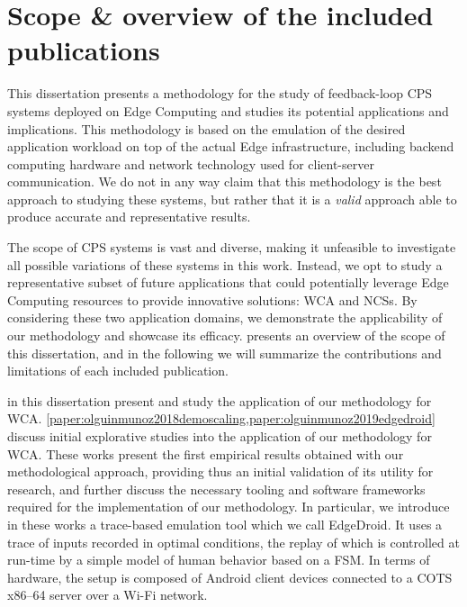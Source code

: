 \section{Scope \& overview of the included publications}

This dissertation presents a methodology for the study of feedback-loop \gls{CPS} systems deployed on Edge Computing and studies its potential applications and implications.
This methodology is based on the emulation of the desired application workload on top of the actual Edge infrastructure, including backend computing hardware and network technology used for client-server communication.
We do not in any way claim that this methodology is the best approach to studying these systems, but rather that it is a \emph{valid} approach able to produce accurate and representative results.



The scope of \gls{CPS} systems is vast and diverse, making it unfeasible to investigate all possible variations of these systems in this work. 
Instead, we opt to study a representative subset of future applications that could potentially leverage Edge Computing resources to provide innovative solutions: \gls{WCA} and \glspl{NCS}.
By considering these two application domains, we demonstrate the applicability of our methodology and showcase its efficacy.
 presents an overview of the scope of this dissertation, and in the following we will summarize the contributions and limitations of each included publication. 

\medskip

 in this dissertation present and study the application of our methodology for \gls{WCA}.
\cref{paper:olguinmunoz2018demoscaling,paper:olguinmunoz2019edgedroid} discuss initial explorative studies into the application of our methodology for \gls{WCA}.
These works present the first empirical results obtained with our methodological approach, providing thus an initial validation of its utility for research, and further discuss the necessary tooling and software frameworks required for the implementation of our methodology.
In particular, we introduce in these works a trace-based emulation tool which we call EdgeDroid.
It uses a trace of inputs recorded in optimal conditions, the replay of which is controlled at run-time by a simple model of human behavior based on a \gls{FSM}.
In terms of hardware, the setup is composed of Android client devices connected to a \gls{COTS} {x86--64} server over a Wi-Fi network.


